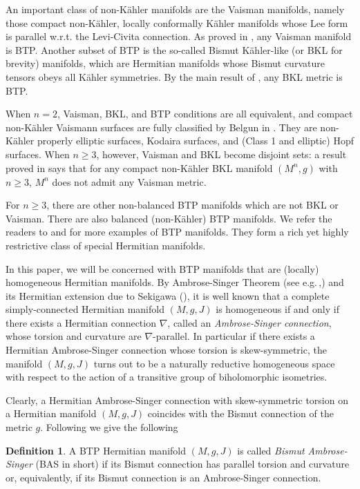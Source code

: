 \documentclass{amsart}
\numberwithin{equation}{section}
\theoremstyle{definition}
\newtheorem{definition}  [theorem]     {Definition}
\renewcommand{\1}{\mathds{1}}
\renewcommand{\>}{\rightarrow}
\begin{document}
An important class of non-K\"ahler manifolds are the Vaisman manifolds, namely those compact non-K\"ahler, locally conformally K\"ahler manifolds whose Lee form is parallel w.r.t. the Levi-Civita connection. As proved in \cite{AV}, any Vaisman manifold is BTP.  Another subset of BTP is the so-called Bismut K\"ahler-like (or BKL for brevity) manifolds, which are Hermitian manifolds whose Bismut curvature tensors obeys all K\"ahler symmetries. By the main result of \cite{ZhaoZ19Str}, any  BKL metric is BTP.

When $n=2$, Vaisman, BKL, and BTP conditions are all equivalent, and compact non-K\"ahler Vaismann surfaces are fully classified by Belgun in \cite{B00}. They are non-K\"ahler properly elliptic surfaces, Kodaira surfaces, and (Class 1 and elliptic) Hopf surfaces. When $n\geq 3$, however, Vaisman and BKL become disjoint sets: a result proved in \cite{YZZ} says that for any compact non-K\"ahler BKL manifold $(M^n,g)$ with $n\geq 3$, $M^n$ does not admit any Vaisman metric.

For $n\geq 3$, there are other non-balanced BTP manifolds which are not BKL or Vaisman. There are also balanced (non-K\"ahler) BTP manifolds. We refer the readers to \cite{ZhaoZ19Nil} and \cite{ZhaoZ22} for more examples of BTP manifolds. They form a rich yet highly restrictive class of special Hermitian manifolds.

In this paper, we will be  concerned with BTP manifolds that are (locally) homogeneous Hermitian manifolds. By Ambrose-Singer Theorem (see e.g.\,\cite{AS},\cite{TV}) and its Hermitian extension due to Sekigawa (\cite{Sekigawa}), it is well known that a complete simply-connected
Hermitian manifold $(M,g,J)$ is homogeneous if and only if there exists a Hermitian connection $\nabla$, called an {\it Ambrose-Singer connection}, whose torsion and curvature are $\nabla$-parallel. In particular if there exists a Hermitian Ambrose-Singer connection whose torsion is skew-symmetric, the manifold $(M,g,J)$ turns out to be a naturally reductive homogeneous space with respect to the action of a transitive group of biholomorphic isometries.


 Clearly, a Hermitian Ambrose-Singer connection with skew-symmetric torsion on a Hermitian manifold $(M,g,J)$ coincides with the Bismut connection of the metric $g$. Following \cite{NiZheng} we give the following
\begin{definition}\label{defAS} A {\rm BTP} Hermitian manifold $(M,g,J)$ is called {\em Bismut Ambrose-Singer} ({\rm BAS} in short) if its Bismut connection has parallel torsion and curvature or, equivalently, if its Bismut connection is an Ambrose-Singer connection.
\end{definition}
\end{document}
